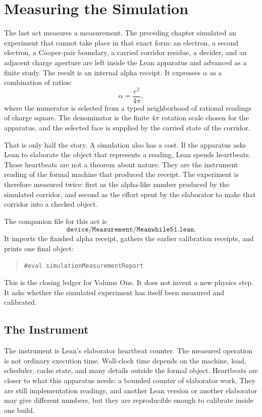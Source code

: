 \chapter{Measuring the Simulation}

The last act measures a measurement. The preceding chapter simulated an experiment that cannot take place in
that exact form: an electron, a second electron, a Cooper-pair boundary, a carried corridor residue, a decider,
and an adjacent charge aperture are left inside the Lean apparatus and advanced as a finite study. The result is
an internal alpha receipt. It expresses \(\alpha\) as a combination of ratios:
\[
  \alpha = \frac{e^2}{4\pi},
\]
where the numerator is selected from a typed neighborhood of rational readings of charge square. The denominator
is the finite \(4\pi\) rotation scale chosen for the apparatus, and the selected face is supplied by the carried
state of the corridor.

That is only half the story. A simulation also has a cost. If the apparatus asks Lean to elaborate the object
that represents a reading, Lean spends heartbeats. Those heartbeats are not a theorem about nature. They are the
instrument reading of the formal machine that produced the receipt. The experiment is therefore measured twice:
first as the alpha-like number produced by the simulated corridor, and second as the effort spent by the
elaborator to make that corridor into a checked object.

The companion file for this act is
\[
  \texttt{device/Measurement/Meanwhile51.lean}.
\]
It imports the finished alpha receipt, gathers the earlier calibration receipts, and prints one final object:
\begin{quote}\small
\begin{verbatim}
#eval simulationMeasurementReport
\end{verbatim}
\end{quote}
This is the closing ledger for Volume One. It does not invent a new physics step. It asks whether the simulated
experiment has itself been measured and calibrated.

\section{The Instrument}

The instrument is Lean's elaborator heartbeat counter. The measured operation is not ordinary execution time.
Wall-clock time depends on the machine, load, scheduler, cache state, and many details outside the formal object.
Heartbeats are closer to what this apparatus needs: a bounded counter of elaborator work. They are still
implementation readings, and another Lean version or another elaborator may give different numbers, but they
are reproducible enough to calibrate inside one build.

